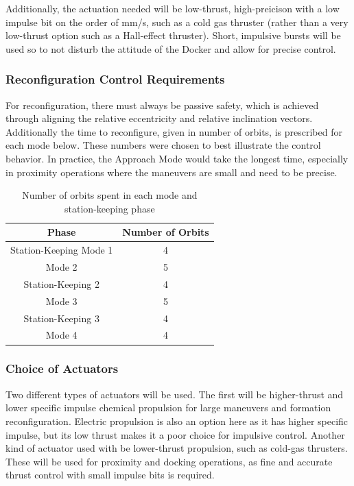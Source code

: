Additionally, the actuation needed will be low-thrust, high-preicison with a low impulse bit on the order of mm/s, such as a cold gas thruster (rather than a very low-thrust option such as a Hall-effect thruster). Short, impulsive bursts will be used so to not disturb the attitude of the Docker and allow for precise control. 


\subsubsection{Reconfiguration Control Requirements}
For reconfiguration, there must always be passive safety, which is achieved through aligning the relative eccentricity and relative inclination vectors. Additionally the time to reconfigure, given in number of orbits, is prescribed for each mode below. These numbers were chosen to best illustrate the control behavior. In practice, the Approach Mode would take the longest time, especially in proximity operations where the maneuvers are small and need to be precise. 

\begin{table}[h!]
\centering
\begin{tabular}{|c|c|}
\hline
\textbf{Phase} & \textbf{Number of Orbits} \\
\hline
Station-Keeping Mode 1 & 4 \\
Mode 2 & 5 \\
Station-Keeping 2 & 4 \\
Mode 3 & 5 \\
Station-Keeping 3 & 4 \\
Mode 4 & 4 \\
\hline
\end{tabular}
\caption{Number of orbits spent in each mode and station-keeping phase} \label{tab:mode_durations}
\end{table}

\subsubsection{Choice of Actuators}
Two different types of actuators will be used. The first will be higher-thrust and lower specific impulse chemical propulsion for large maneuvers and formation reconfiguration. Electric propulsion is also an option here as it has higher specific impulse, but its low thrust makes it a poor choice for impulsive control. Another kind of actuator used with be lower-thrust propulsion, such as cold-gas thrusters. These will be used for proximity and docking operations, as fine and accurate thrust control with small impulse bits is required. 

